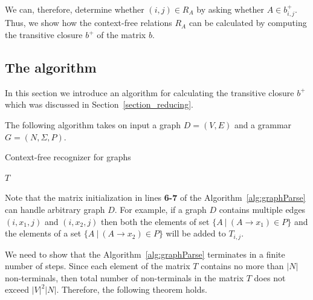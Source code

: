 We can, therefore, determine whether $(i,j) \in R_A$ by asking whether $A \in b^+_{i,j}$. Thus, we show how the context-free relations $R_A$ can be calculated by computing the transitive closure $b^+$ of the matrix $b$.



\subsection{The algorithm} \label{section_algorithm}
In this section we introduce an algorithm for calculating the transitive closure $b^+$ which was discussed in Section~\ref{section_reducing}.

The following algorithm takes on input a graph $D = (V, E)$ and a grammar $G = (N,\Sigma,P)$.

\begin{algorithm}[H]
\begin{algorithmic}[1]
\caption{Context-free recognizer for graphs}
\label{alg:graphParse}
    
    \EndFor    
       
    \EndWhile
\State \Return $T$
\EndFunction
\end{algorithmic}
\end{algorithm}

Note that the matrix initialization in lines \textbf{6-7} of the Algorithm~\ref{alg:graphParse} can handle arbitrary graph $D$. For example, if a graph $D$ contains multiple edges $(i,x_1,j)$ and $(i,x_2,j)$ then both the elements of set $\{A~|~(A \rightarrow x_1) \in P \}$ and the elements of a set $\{A~|~(A \rightarrow x_2) \in P \}$ will be added to $T_{i,j}$.

We need to show that the Algorithm~\ref{alg:graphParse} terminates in a finite number of steps. Since each element of the matrix $T$ contains no more than $|N|$ non-terminals, then total number of non-terminals in the matrix $T$ does not exceed $|V|^2|N|$. Therefore, the following theorem holds.

